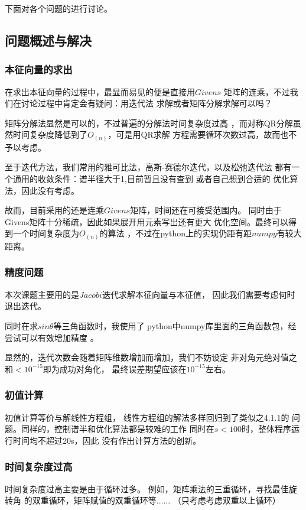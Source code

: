\documentclass[11pt, a4paper, oneside]{ctexart}
\begin{document}
{{{{    下面对各个问题的进行讨论。
}
\subsection{问题概述与解决}
\subsubsection{本征向量的求出}
在求出本征向量的过程中，最显而易见的便是直接用$Givens$
矩阵的连乘，不过我们在讨论过程中肯定会有疑问：用迭代法
求解或者矩阵分解求解可以吗？

矩阵分解法显然是可以的，不过普遍的分解法时间复杂度过高
，而对称QR分解虽然时间复杂度降低到了$O_{(n)}$\cite{a}，可是用QR求解
方程需要循环次数过高，故而也不予以考虑。

至于迭代方法，我们常用的雅可比法，高斯-赛德尔迭代，以及松弛迭代法
都有一个通用的收敛条件：谱半径大于1,目前暂且没有查到
或者自己想到合适的
优化算法，因此没有考虑。

故而，目前采用的还是连乘$Givens$矩阵，时间还在可接受范围内。
同时由于Givens矩阵十分稀疏，因此如果展开用元素写出还有更大
优化空间。最终可以得到一个时间复杂度为$O_{(n)}$的算法
，不过在python上的实现仍距有距$numpy$有较大距离。
\subsubsection{精度问题}
本次课题主要用的是$Jacobi$迭代求解本征向量与本征值，
因此我们需要考虑何时退出迭代。

同时在求$sin\theta$等三角函数时，我使用了
python中numpy库里面的三角函数包，经尝试可以有效增加精度
。

显然的，迭代次数会随着矩阵维数增加而增加，我们不妨设定
非对角元绝对值之和$<10^{-15}$即为成功对角化，
最终误差期望应该在$10^{-15}$左右。

\subsubsection{初值计算}
初值计算等价与解线性方程组，
线性方程组的解法多样回归到了类似之4.1.1的
问题。同样的，控制谱半和优化算法都是较难的工作
同时在$s<100$时，整体程序运行时间均不超过20s，因此
没有作出计算方法的创新。


\subsubsection{时间复杂度过高}

时间复杂度过高主要是由于循环过多。
例如，矩阵乘法的三重循环，寻找最佳旋转角
的双重循环，矩阵赋值的双重循环等$\dots\dots$
（只考虑考虑双重以上循环）

}}}
\end{document}
